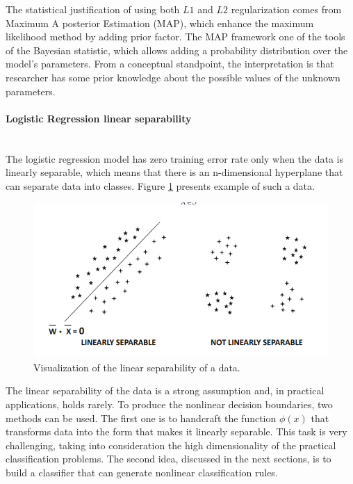 The statistical justification of using both $L1$ and $L2$ regularization comes from Maximum A posterior Estimation (MAP), which enhance the maximum likelihood method by adding prior factor. The MAP framework one of the tools of the Bayesian statistic, which allows adding a probability distribution over the model's parameters. From a conceptual standpoint, the interpretation is that researcher has some prior knowledge about the possible values of the unknown parameters.

\paragraph{Logistic Regression linear separability} \mbox{}
\\

The logistic regression model has zero training error rate only when the data is linearly separable, which means that there is an n-dimensional hyperplane that can separate data into classes. Figure \ref{fig:linear separability} presents example of such a data.



\begin{figure}[!h]
\centering
\includegraphics{figures/limear_separability.PNG}
\caption{Visualization of the linear separability of a data.  
\label{fig:linear separability}}
\end{figure}


The linear separability of the data is a strong assumption and, in practical applications, holds rarely. To produce the nonlinear decision boundaries, two methods can be used. The first one is to handcraft the function $\phi(x)$ that transforms data into the form that makes it linearly separable. This task is very challenging, taking into consideration the high dimensionality of the practical classification problems. The second idea, discussed in the next sections, is to build a classifier that can generate nonlinear classification rules. 


